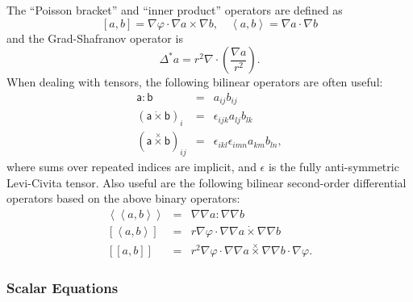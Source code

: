\documentclass[letterpaper]{book}
\newcommand{\tensor}[1]{\mathsf{#1}}
\newcommand{\tor}{\varphi}              %
\newcommand{\grad}[1]{\nabla #1}
\renewcommand{\div}[1]{\nabla \cdot #1}
\newcommand{\dotdot}{:}
\newcommand{\dottimes}{\dot\times}
\newcommand{\timestimes}{\stackrel{\times}{\times}}
\newcommand{\gs}[1]{\Delta^* #1}
\newcommand{\pb}[2]{\left[#1,#2\right]}
\newcommand{\ip}[2]{\left\langle  #1,#2\right\rangle}
\newcommand{\funcss}[2]{
  \left\langle\left\langle #1,#2 \right\rangle\right\rangle}
\newcommand{\funcsa}[2]{\left[\left\langle #1,#2 \right\rangle\right]}
\newcommand{\funcaa}[2]{\left[\left[ #1,#2 \right]\right]}
\begin{document}
The ``Poisson bracket'' and ``inner product'' operators
are defined as
\[ 
\pb{a}{b} = \nabla \tor \cdot \grad{a} \times \grad{b}, 
\quad
\ip{a}{b} = \grad{a} \cdot \grad{b}
\]
and the Grad-Shafranov operator is
\[
\gs{a} = r^2 \div{\left(\frac{\grad{a}}{r^2}\right)}.
\]
When dealing with tensors, the following bilinear operators are often
useful:
\begin{eqnarray*}
  \tensor{a} \dotdot \tensor{b} & = & a_{i j} b_{i j}
  \\
  (\tensor{a} \dottimes \tensor{b})_i & = & \epsilon_{i j k}
  a_{l j} b_{l k}
  \\
  (\tensor{a} \timestimes \tensor{b})_{i j} & = & 
  \epsilon_{i k l} \epsilon_{i m n} a_{k m} b_{l n},
\end{eqnarray*}
where sums over repeated indices are implicit, and $\tensor{\epsilon}$
is the fully anti-symmetric Levi-Civita tensor.  Also useful are the
following bilinear second-order differential operators based on the
above binary operators:
\begin{eqnarray*}
  \funcss{a}{b} & = & \grad{\grad{a}} \dotdot \grad{\grad{b}} \\
  \funcsa{a}{b} & = & r \grad{\tor} \cdot 
  \grad{\grad{a}} \dottimes \grad{\grad{b}}\\
  \funcaa{a}{b} & = & r^2 \grad{\tor} \cdot 
       \grad{\grad{a}} \timestimes \grad{\grad{b}}
       \cdot \grad{\tor}.
\end{eqnarray*}

\subsubsection{Scalar Equations}
\end{document}

